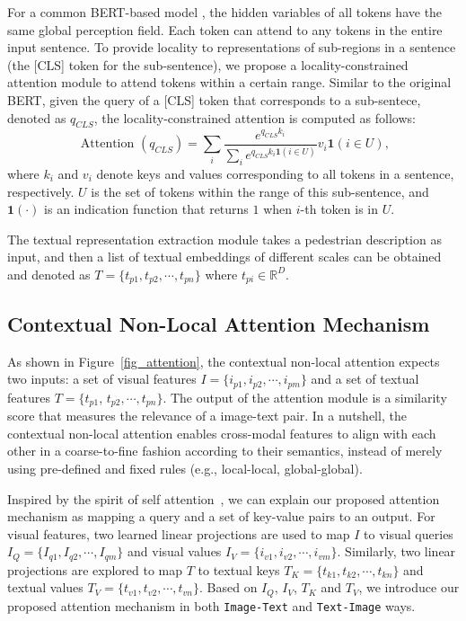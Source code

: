 \documentclass[final]{cvpr}
\begin{document}
For a common BERT-based model \cite{devlin2018bert}, the hidden variables of all tokens have the same global perception field. Each token can attend to any tokens in the entire input sentence. To provide locality to representations of sub-regions in a sentence (the [CLS] token for the sub-sentence), we propose a locality-constrained attention module to attend tokens within a certain range. Similar to the original BERT, given the query of a [CLS] token that corresponds to a sub-sentece, denoted as $q_{CLS}$, the locality-constrained attention is computed as follows:
\begin{equation}
\label{eq_locality_constrained_attention}
\text { Attention }(q_{CLS})= \sum_i \frac{e^{q_{CLS}k_i}}{\sum_ie^{q_{CLS}k_i\mathbf{1}(i\in U)}}v_i\mathbf{1}(i\in U), 
\end{equation}
where $k_i$ and $v_i$ denote keys and values corresponding to all tokens in a sentence, respectively. $U$ is the set of tokens within the range of this sub-sentence, and $\mathbf{1}(\cdot)$ is an indication function that returns $1$ when $i$-th token is in $U$. 

The textual representation extraction module takes a pedestrian description as input, and then a list of textual embeddings of different scales can be obtained and denoted as $T = \{t_{p1}, t_{p2}, \cdots, t_{pn}\}$ where $t_{pi} \in \mathbb{R}^{D}$.

\subsection{Contextual Non-Local Attention Mechanism}
As shown in Figure~\ref{fig_attention}, the contextual non-local attention expects two inputs: a set of visual features $I=\{i_{p1}, i_{p2}, \cdots, i_{pm}\}$ and a set of textual features $T=\{t_{p1}$, $t_{p2}, \cdots, t_{pn}\}$. The output of the attention module is a similarity score that measures the relevance of a image-text pair. In a nutshell, the contextual non-local attention enables cross-modal features to align with each other in a coarse-to-fine fashion according to their semantics, instead of merely using pre-defined and fixed rules (e.g., local-local, global-global).

Inspired by the spirit of self attention~\cite{vaswani2017attention}, we can explain our proposed attention mechanism as mapping a query and a set of key-value pairs to an output. 
For visual features, two learned linear projections are used to map $I$ to visual queries $I_{Q}=\{I_{q1}, I_{q2},\cdots, I_{qm}\}$ and visual values $I_{V}=\{i_{v1}, i_{v2},\cdots, i_{vm}\}$. Similarly, two linear projections are explored to map $T$ to textual keys $T_{K}=\{t_{k1}, t_{k2},\cdots, t_{kn}\}$ and textual values $T_{V}=\{t_{v1}, t_{v2},\cdots, t_{vn}\}$. 
Based on $I_{Q}$, $I_{V}$, $T_{K}$ and $T_{V}$, we introduce our proposed attention mechanism in both \texttt{Image-Text} and \texttt{Text-Image} ways.
\end{document}

